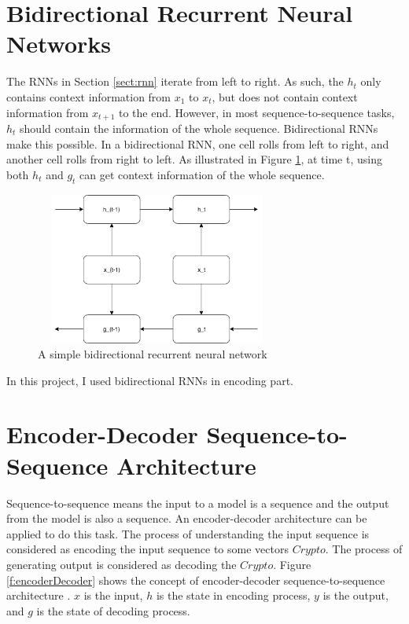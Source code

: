 \documentclass[modernstyle,12pt]{sjsuthesis}
\theoremstyle{definition}
\begin{document}
\section{Bidirectional Recurrent Neural Networks}

The RNNs in Section \ref{sect:rnn}
iterate from left to right. As such, the $h_t$ only contains context information from $x_1$ to $x_t$, but does not contain context information from $x_{t+1}$ to the end. However, in most sequence-to-sequence tasks, $h_t$ should contain the information of the whole sequence. Bidirectional RNNs make this possible. In a bidirectional RNN, one cell rolls from left to right, and another cell rolls from right to left. As illustrated in Figure \ref{f:bidirectionalRnn}, at time t, using both $h_t$ and $g_t$ can get context information of the whole sequence.

\begin{figure}[htbp]\centering
  \includegraphics[width=8cm, height=5cm]{figures/bidirectionalRnn.png}
  \caption{A simple bidirectional recurrent neural network}
  \label{f:bidirectionalRnn}
\end{figure}

In this project, I used bidirectional RNNs in encoding part.

\section{Encoder-Decoder Sequence-to-Sequence Architecture}

Sequence-to-sequence means the input to a model is a sequence and the output from the model is also a sequence. An encoder-decoder architecture can be applied to do this task. The process of understanding the input sequence is considered as encoding the input sequence to some vectors $Crypto$. The process of generating output is considered as decoding the $Crypto$. Figure \ref{f:encoderDecoder} shows the concept of encoder-decoder sequence-to-sequence architecture . $x$ is the input, $h$ is the state in encoding process, $y$ is the output, and $g$ is the state of decoding process.
\end{document}
